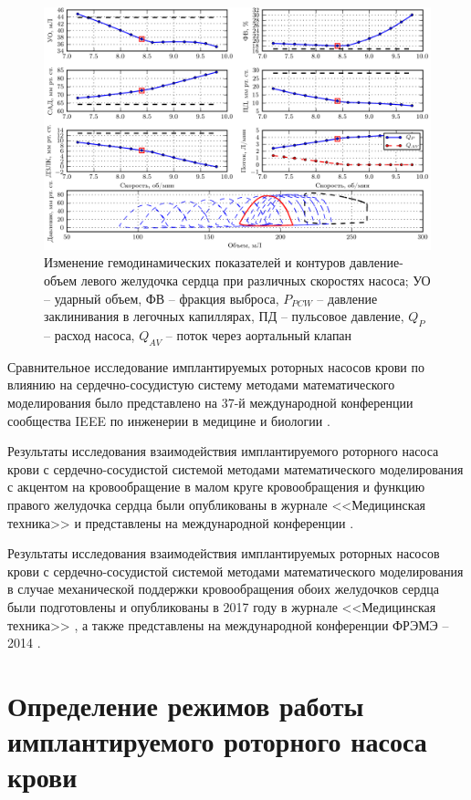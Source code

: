 \begin{figure}[ht] 
  \center
  \includegraphics [scale=1.0] {../images/c2_cvs_pump_hemodynamics}
  \caption{Изменение гемодинамических показателей и контуров давление-объем левого желудочка сердца при различных скоростях насоса; УО -- ударный объем, ФВ -- фракция выброса, $P_{PCW}$ -- давление заклинивания в легочных капиллярах, ПД -- пульсовое давление, $Q_P$ -- расход насоса, $Q_{AV}$ -- поток через аортальный клапан} \label{img:cvs_pump_hemodynamics}
\end{figure}

Сравнительное исследование имплантируемых роторных насосов крови по влиянию на сердечно-сосудистую систему методами математического моделирования было представлено на 37-й международной конференции сообщества IEEE по инженерии в медицине и биологии \cite{embc_2015_2}. 

Результаты исследования взаимодействия имплантируемого роторного насоса крови с сердечно-сосудистой системой методами математического моделирования с акцентом на кровообращение в малом круге кровообращения и функцию правого желудочка сердца были опубликованы в журнале <<Медицинская техника>> \cite{mt4_2014} и представлены на международной конференции \cite{rgc_2014}.

Результаты исследования взаимодействия имплантируемых роторных насосов крови с сердечно-сосудистой системой методами математического моделирования в случае механической поддержки кровообращения обоих желудочков сердца были подготовлены и опубликованы в 2017 году в журнале <<Медицинская техника>> \cite{mt1_2017}, а также представлены на международной конференции ФРЭМЭ -- 2014 \cite{freme_2014}.   

\section{Определение режимов работы имплантируемого роторного насоса крови} \label{sect3_2}

